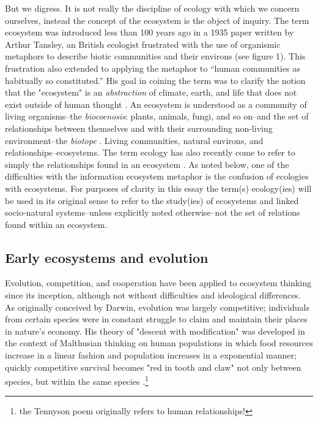 But we digress. It is not really the discipline of ecology with which we concern ourselves, instead the concept of the ecosystem is the object of inquiry. The term ecosystem was introduced less than 100 years ago in a 1935 paper written by Arthur Tansley, an British ecologist frustrated with the use of organismic metaphors to describe biotic communities and their environs (see figure 1). This frustration also extended to applying the metaphor to “human communities as habitually so constituted.” His goal in coining the term was to clarify the notion that the "ecosystem" is an \textit{abstraction} of climate, earth, and life that does not exist outside of human thought \citep{tansley_1935}. An ecosystem is understood as a community of living organisms--the \textit{biocoenosis}: plants, animals, fungi, and so on--and the set of relationships between themselves and with their surrounding non-living environment--the \textit{biotope} \citep{tansley_1935,odum_1953}. Living communities, natural environs, and relationships--ecosystems. The term ecology has also recently come to refer to simply the relationships found in an ecosystem \citep{oed_2008}. As noted below, one of the difficulties with the information ecosystem metaphor is the confusion of ecologies with ecosystems. For purposes of clarity in this essay the term(s) ecology(ies) will be used in its original sense to refer to the study(ies) of ecosystems and linked socio-natural systems--unless explicitly noted otherwise--not the set of relations found within an ecosystem. 

\subsection{Early ecosystems and evolution}

Evolution, competition, and cooperation have been applied to ecosystem thinking since its inception, although not without difficulties and ideological differences. As originally conceived by Darwin, evolution was largely competitive; individuals from certain species were in constant struggle to claim and maintain their places in nature's economy. His theory of "descent with modification" was developed in the context of Malthusian thinking on human populations in which food resources increase in a linear fashion and population increases in a exponential manner; quickly competitive survival becomes "red in tooth and claw" not only between species, but within the same species \citep{stoddart_1966,tennyson_1849}.\footnote{the Tennyson poem originally refers to human relationships!} 

